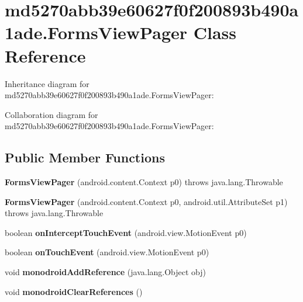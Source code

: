 \hypertarget{classmd5270abb39e60627f0f200893b490a1ade_1_1_forms_view_pager}{}\section{md5270abb39e60627f0f200893b490a1ade.\+Forms\+View\+Pager Class Reference}
\label{classmd5270abb39e60627f0f200893b490a1ade_1_1_forms_view_pager}


Inheritance diagram for md5270abb39e60627f0f200893b490a1ade.\+Forms\+View\+Pager\+:


Collaboration diagram for md5270abb39e60627f0f200893b490a1ade.\+Forms\+View\+Pager\+:
\subsection*{Public Member Functions}
\begin{DoxyCompactItemize}
\item 
\mbox{\label{classmd5270abb39e60627f0f200893b490a1ade_1_1_forms_view_pager_a1e733ee4a3786f4f7bd543951206fb73}} 
{\bfseries Forms\+View\+Pager} (android.\+content.\+Context p0)  throws java.\+lang.\+Throwable 	
\item 
\mbox{\label{classmd5270abb39e60627f0f200893b490a1ade_1_1_forms_view_pager_ab7dadec2523ca0ad6456f61a31fbe5c9}} 
{\bfseries Forms\+View\+Pager} (android.\+content.\+Context p0, android.\+util.\+Attribute\+Set p1)  throws java.\+lang.\+Throwable 	
\item 
\mbox{\label{classmd5270abb39e60627f0f200893b490a1ade_1_1_forms_view_pager_a1ad288fa95e598ccb5cf989878fa5bbf}} 
boolean {\bfseries on\+Intercept\+Touch\+Event} (android.\+view.\+Motion\+Event p0)
\item 
\mbox{\label{classmd5270abb39e60627f0f200893b490a1ade_1_1_forms_view_pager_a48682b3406ea863f47698921ff4bb49e}} 
boolean {\bfseries on\+Touch\+Event} (android.\+view.\+Motion\+Event p0)
\item 
\mbox{\label{classmd5270abb39e60627f0f200893b490a1ade_1_1_forms_view_pager_afd06d43e627d980375c67e56e0606283}} 
void {\bfseries monodroid\+Add\+Reference} (java.\+lang.\+Object obj)
\item 
\mbox{\label{classmd5270abb39e60627f0f200893b490a1ade_1_1_forms_view_pager_a53b751fba028a911988261b0a536d2ab}} 
void {\bfseries monodroid\+Clear\+References} ()
\end{DoxyCompactItemize}

